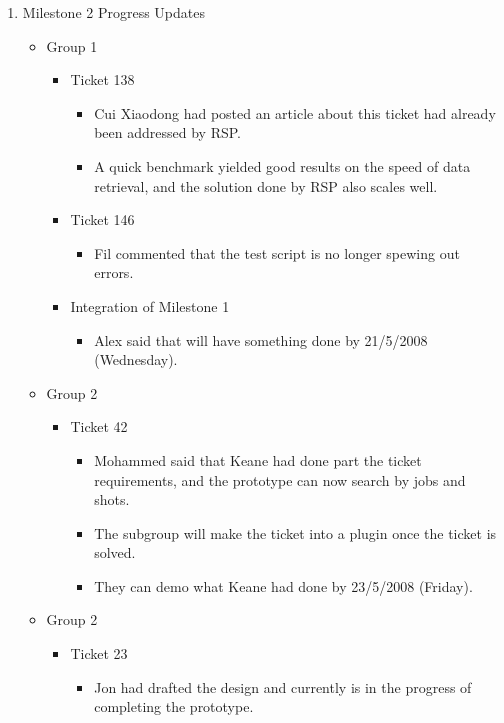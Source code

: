 \documentclass{letter}
\begin{document}
\begin{enumerate}
\begin{itemize}
\begin{itemize}
			\end{itemize}
	\end{itemize}
\item Milestone 2 Progress Updates
	\begin{itemize}
		\item Group 1
			\begin{itemize}
				\item Ticket 138
					\begin{itemize}
						\item Cui Xiaodong had posted an article about this ticket had already been addressed by RSP. 
						\item A quick benchmark yielded good results on the speed of data retrieval, and the solution done by RSP also scales well. 
					\end{itemize}
				\item Ticket 146
					\begin{itemize}
							\item Fil commented that the test script is no longer spewing out errors. 
					\end{itemize}
				\item Integration of Milestone 1
					\begin{itemize}
						\item Alex said that will have something done by 21/5/2008 (Wednesday).
					\end{itemize}
			\end{itemize}
		\item Group 2
			\begin{itemize}
				\item Ticket 42
					\begin{itemize}
							\item Mohammed said that Keane had done part the ticket requirements, and the prototype can now search by jobs and shots.
							\item The subgroup will make the ticket into a plugin once the ticket is solved. 
							\item They can demo what Keane had done by 23/5/2008 (Friday).
					\end{itemize}
			\end{itemize}
		\item Group 2
			\begin{itemize}
				\item Ticket 23
					\begin{itemize}
						\item Jon had drafted the design and currently is in the progress of completing the prototype. 

\end{itemize}
\end{itemize}
\end{itemize}
\end{enumerate}
\end{document}
